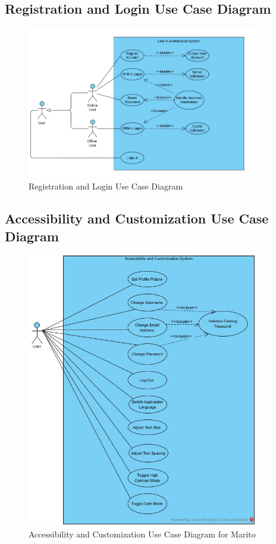 \documentclass[12pt]{article}
\begin{document}
\subsection{Registration and Login Use Case Diagram}
\begin{figure}[H]
  \centering
  \includegraphics[width=0.9\textwidth]{registration_login.png}
  \caption{Registration and Login Use Case Diagram}
  \label{fig:reg-log-use-case}
\end{figure}

\subsection{Accessibility and Customization Use Case Diagram}
\begin{figure}[H]
  \centering
  \includegraphics[width=0.9\textwidth]{Accessibility and Customization System.jpg}
  \caption{Accessibility and Customization Use Case Diagram for Marito}
  \label{fig:accessibility-customization-use-case}
\end{figure}
\end{document}

